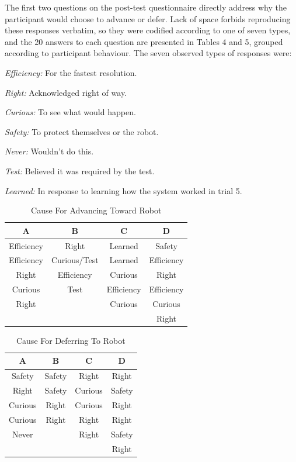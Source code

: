 \documentclass[letterpaper, 10 pt, conference]{ieeeconf}  %
\begin{document}
The first two questions on the post-test questionnaire directly address why the participant would choose to advance or defer. Lack of space forbids reproducing these responses verbatim, so they were codified according to one of seven types, and the 20 answers to each question are presented in Tables 4 and 5, grouped according to participant behaviour. The seven observed types of responses were:

\textit{Efficiency:} For the fastest resolution.

\textit{Right:} Acknowledged right of way.

\textit{Curious:} To see what would happen.

\textit{Safety:} To protect themselves or the robot.

\textit{Never:} Wouldn't do this.

\textit{Test:} Believed it was required by the test.

\textit{Learned:} In response to learning how the system worked in trial 5.

\begin{table}[h]
\caption{Cause For Advancing Toward Robot}
\label{Advance}
\begin{center}
\begin{tabular}{|c||c||c||c|}
\hline
\textbf{A} & \textbf{B} & \textbf{C} & \textbf{D}\\
\hline
Efficiency & Right & Learned & Safety\\
\hline
Efficiency & Curious/Test & Learned & Efficiency\\
\hline
Right & Efficiency & Curious & Right\\
\hline
Curious & Test & Efficiency & Efficiency\\
\hline
Right & & Curious & Curious\\
\hline
 & & & Right\\
\hline
\end{tabular}
\end{center}
\end{table}

\begin{table}[h]
\caption{Cause For Deferring To Robot}
\label{Defer}
\begin{center}
\begin{tabular}{|c||c||c||c|}
\hline
\textbf{A} & \textbf{B} & \textbf{C} & \textbf{D}\\
\hline
Safety & Safety & Right & Right\\
\hline
Right & Safety & Curious & Safety\\
\hline
Curious & Right & Curious & Right\\
\hline
Curious & Right & Right & Right\\
\hline
Never & & Right & Safety\\
\hline
 & & & Right\\
\hline
\end{tabular}
\end{center}
\end{table}
\end{document}
